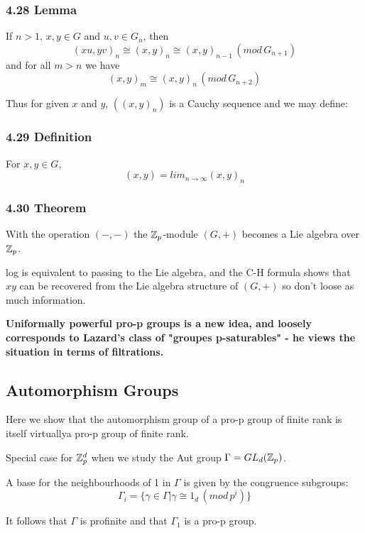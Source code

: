 \subsubsection{4.28 Lemma}
If $n > 1,\,x,y\in G$ and $u,v\in G_n$, then
$$(xu,yv)_n\cong (x,y)_n\cong (x,y)_{n-1}\,(mod\,G_{n+1})$$
and for all $m>n$ we have 
$$(x,y)_m\cong (x,y)_n\,(mod\,G_{n+2})$$

Thus for given $x$ and $y$, $((x,y)_n)$ is a Cauchy sequence and we may define:

\subsubsection{4.29 Definition}
For $x,y\in G$,
$$(x,y) = lim_{n\rightarrow \infty} (x,y)_n$$

\subsubsection{4.30 Theorem}
With the operation $(-,-)$ the $\mathbb Z_p$-module $(G,+)$ becomes a Lie algebra over $\mathbb Z_p$.


log is equivalent to passing to the Lie algebra, and the C-H formula shows that $xy$ can be recovered from the Lie algebra structure of $(G,+)$ so don't loose as much information.

\textbf{Uniformally powerful pro-p groups is a new idea, and loosely corresponds to Lazard's class of "groupes p-saturables" - he views the situation in terms of filtrations.}















\subsection{Automorphism Groups}
Here we show that the automorphism group of a pro-p group of finite rank is itself virtuallya pro-p group of finite rank. 

Special case for $\mathbb Z_p^d$ when we study the Aut group $\Gamma = GL_d (\mathbb Z_p)$.

A base for the neighbourhoods of 1 in $\Gamma$ is given by the congruence subgroups:
$$\Gamma_i = \{ \gamma\in \Gamma | \gamma \cong 1_d\, (mod\, p^i)\}$$

It follows that $\Gamma$ is profinite and that $\Gamma_1$ is a pro-p group.

